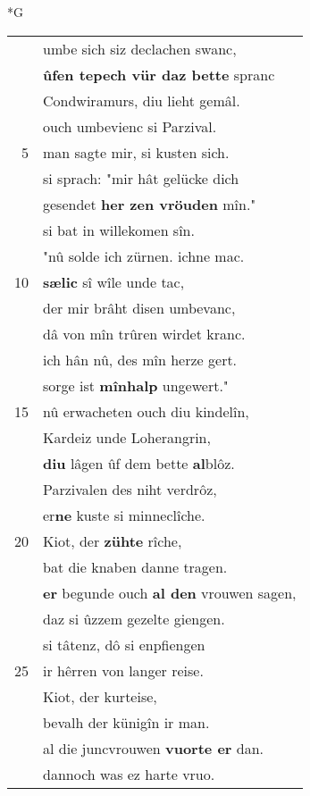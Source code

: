 \documentclass[8pt,a4paper,notitlepage]{article}
\begin{document}
\newpage
\begin{table}[ht]
\begin{minipage}[t]{0.5\linewidth}
\small
\begin{center}*G
\end{center}
\begin{tabular}{rl}
 & umbe sich siz declachen swanc,\\ 
 & \textbf{ûfen tepech vür daz bette} spranc\\ 
 & Condwiramurs, diu lieht gemâl.\\ 
 & ouch umbevienc si Parzival.\\ 
5 & man sagte mir, si kusten sich.\\ 
 & si sprach: "mir hât gelücke dich\\ 
 & gesendet \textbf{her zen vröuden} mîn."\\ 
 & si bat in willekomen sîn.\\ 
 & "nû solde ich zürnen. ichne mac.\\ 
10 & \textbf{sælic} sî wîle unde tac,\\ 
 & der mir brâht disen umbevanc,\\ 
 & dâ von mîn trûren wirdet kranc.\\ 
 & ich hân nû, des mîn herze gert.\\ 
 & sorge ist \textbf{mînhalp} ungewert."\\ 
15 & nû erwacheten ouch diu kindelîn,\\ 
 & Kardeiz unde Loherangrin,\\ 
 & \textbf{diu} lâgen ûf dem bette \textbf{al}blôz.\\ 
 & Parzivalen des niht verdrôz,\\ 
 & er\textbf{ne} kuste si minneclîche.\\ 
20 & Kiot, der \textbf{zühte} rîche,\\ 
 & bat die knaben danne tragen.\\ 
 & \textbf{er} begunde ouch \textbf{al den} vrouwen sagen,\\ 
 & daz si ûzzem gezelte giengen.\\ 
 & si tâtenz, dô si enpfiengen\\ 
25 & ir hêrren von langer reise.\\ 
 & Kiot, der kurteise,\\ 
 & bevalh der künigîn ir man.\\ 
 & al die juncvrouwen \textbf{vuorte er} dan.\\ 
 & dannoch was ez harte vruo.\\ 

\end{tabular}
\end{minipage}
\end{table}
\end{document}
